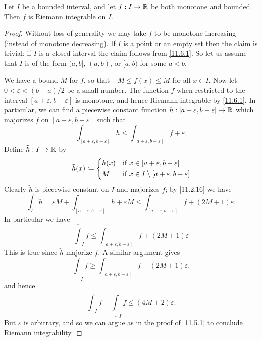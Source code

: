 \begin{cor}\label{11.6.3}
  Let \(I\) be a bounded interval, and let \(f : I \to \mathbb{R}\) be both monotone and bounded.
  Then \(f\) is Riemann integrable on \(I\).
\end{cor}

\begin{proof}
  Without loss of generality we may take \(f\) to be monotone increasing (instead of monotone decreasing).
  If \(I\) is a point or an empty set then the claim is trivial;
  if \(I\) is a closed interval the claim follows from \cref{11.6.1}.
  So let us assume that \(I\) is of the form \((a, b]\), \((a, b)\), or \([a, b)\) for some \(a < b\).

  We have a bound \(M\) for \(f\), so that \(-M \leq f(x) \leq M\) for all \(x \in I\).
  Now let \(0 < \varepsilon < (b - a) / 2\) be a small number.
  The function \(f\) when restricted to the interval \([a + \varepsilon, b - \varepsilon]\) is monotone, and hence Riemann integrable by \cref{11.6.1}.
  In particular, we can find a piecewise constant function \(h : [a + \varepsilon, b - \varepsilon] \to \mathbb{R}\) which majorizes \(f\) on \([a + \varepsilon, b - \varepsilon]\) such that
  \[
    \int_{[a + \varepsilon, b - \varepsilon]} h \leq \int_{[a + \varepsilon, b - \varepsilon]} f + \varepsilon.
  \]
  Define \(\tilde{h} : I \to \mathbb{R}\) by
  \[
    \tilde{h}(x) \coloneqq \begin{dcases}
      h(x) & \text{if } x \in [a + \varepsilon, b - \varepsilon]             \\
      M    & \text{if } x \in I \setminus [a + \varepsilon, b - \varepsilon]
    \end{dcases}
  \]
  Clearly \(\tilde{h}\) is piecewise constant on \(I\) and majorizes \(f\);
  by \cref{11.2.16} we have
  \[
    \int_I \tilde{h} = \varepsilon M + \int_{[a + \varepsilon, b - \varepsilon]} h + \varepsilon M \leq \int_{[a + \varepsilon, b - \varepsilon]} f + (2M + 1) \varepsilon.
  \]
  In particular we have
  \[
    \overline{\int}_I f \leq \int_{[a + \varepsilon, b - \varepsilon]} f + (2M + 1) \varepsilon
  \]
  This is true since \(\tilde{h}\) majorize \(f\).
  A similar argument gives
  \[
    \underline{\int}_I f \geq \int_{[a + \varepsilon, b - \varepsilon]} f - (2M + 1) \varepsilon.
  \]
  and hence
  \[
    \overline{\int}_I f - \underline{\int}_I f \leq (4M + 2) \varepsilon.
  \]
  But \(\varepsilon\) is arbitrary, and so we can argue as in the proof of \cref{11.5.1} to conclude Riemann integrability.
\end{proof}

